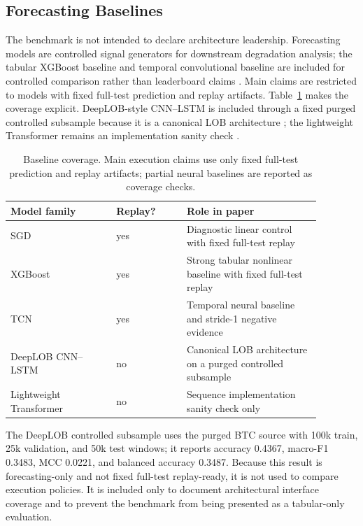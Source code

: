 \documentclass[conference]{IEEEtran}
\begin{document}
\subsection{Forecasting Baselines}
The benchmark is not intended to declare architecture leadership. Forecasting models are controlled signal generators for downstream degradation analysis; the tabular XGBoost baseline and temporal convolutional baseline are included for controlled comparison rather than leaderboard claims \cite{chen2016xgboost,bai2018tcn}. Main claims are restricted to models with fixed full-test prediction and replay artifacts. Table~\ref{tab:baseline_coverage} makes the coverage explicit. DeepLOB-style CNN--LSTM is included through a fixed purged controlled subsample because it is a canonical LOB architecture \cite{deeplob2019,briola2025lobframe}; the lightweight Transformer remains an implementation sanity check \cite{xiao2025lit}.

\begin{table}[t]
\centering
\caption{Baseline coverage. Main execution claims use only fixed full-test prediction and replay artifacts; partial neural baselines are reported as coverage checks.}
\label{tab:baseline_coverage}
\scriptsize
\setlength{\tabcolsep}{2pt}
\begin{tabular}{p{0.30\linewidth}p{0.20\linewidth}p{0.38\linewidth}}
\toprule
Model family & Replay? & Role in paper \\
\midrule
SGD & yes & Diagnostic linear control with fixed full-test replay \\
XGBoost & yes & Strong tabular nonlinear baseline with fixed full-test replay \\
TCN & yes & Temporal neural baseline and stride-1 negative evidence \\
DeepLOB CNN--LSTM & no & Canonical LOB architecture on a purged controlled subsample \\
Lightweight Transformer & no & Sequence implementation sanity check only \\
\bottomrule
\end{tabular}
\end{table}

The DeepLOB controlled subsample uses the purged BTC source with 100k train, 25k validation, and 50k test windows; it reports accuracy 0.4367, macro-F1 0.3483, MCC 0.0221, and balanced accuracy 0.3487. Because this result is forecasting-only and not fixed full-test replay-ready, it is not used to compare execution policies. It is included only to document architectural interface coverage and to prevent the benchmark from being presented as a tabular-only evaluation.
\end{document}
